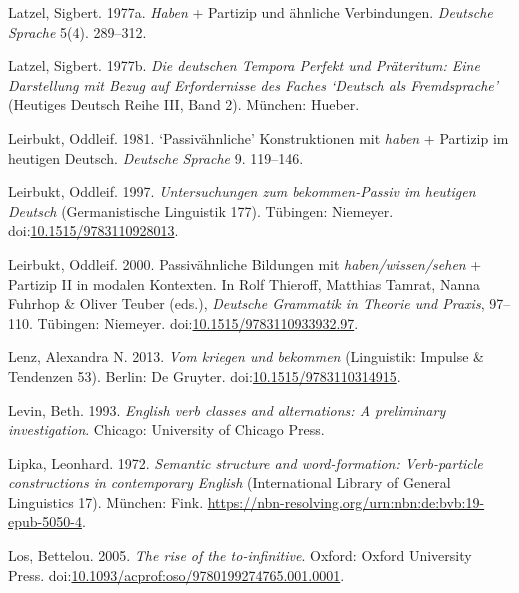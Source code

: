 \leavevmode{}%
Latzel, Sigbert. 1977a. \emph{Haben} + {Partizip} und ähnliche
{Verbindungen}. \emph{Deutsche Sprache} 5(4). 289--312.

\leavevmode{}%
Latzel, Sigbert. 1977b. \emph{Die deutschen {Tempora} {Perfekt} und
{Präteritum}: Eine {Darstellung} mit {Bezug} auf {Erfordernisse} des
{Faches} {`{Deutsch} als {Fremdsprache}'}} (Heutiges Deutsch Reihe III,
Band 2). München: Hueber.

\leavevmode{}%
Leirbukt, Oddleif. 1981. {`Passivähnliche'} {Konstruktionen} mit
\emph{haben} + {Partizip} im heutigen {Deutsch}. \emph{Deutsche Sprache}
9. 119--146.

\leavevmode{}%
Leirbukt, Oddleif. 1997. \emph{Untersuchungen zum
\emph{bekommen}-{Passiv} im heutigen {Deutsch}} (Germanistische
Linguistik 177). Tübingen: Niemeyer.
doi:\href{https://doi.org/10.1515/9783110928013}{10.1515/9783110928013}.

\leavevmode{}%
Leirbukt, Oddleif. 2000. Passivähnliche {Bildungen} mit
\emph{haben/wissen/sehen} + {Partizip II} in modalen {Kontexten}. In
Rolf Thieroff, Matthias Tamrat, Nanna Fuhrhop \& Oliver Teuber (eds.),
\emph{{Deutsche Grammatik in Theorie und Praxis}}, 97--110. Tübingen:
Niemeyer.
doi:\href{https://doi.org/10.1515/9783110933932.97}{10.1515/9783110933932.97}.

\leavevmode{}%
Lenz, Alexandra N. 2013. \emph{Vom \emph{kriegen} und \emph{bekommen}}
(Linguistik: Impulse \& Tendenzen 53). Berlin: De Gruyter.
doi:\href{https://doi.org/10.1515/9783110314915}{10.1515/9783110314915}.

\leavevmode{}%
Levin, Beth. 1993. \emph{English verb classes and alternations: A
preliminary investigation}. Chicago: University of Chicago Press.

\leavevmode{}%
Lipka, Leonhard. 1972. \emph{Semantic structure and word-formation:
Verb-particle constructions in contemporary {English}} (International
Library of General Linguistics 17). München: Fink.
\url{https://nbn-resolving.org/urn:nbn:de:bvb:19-epub-5050-4}.

\leavevmode{}%
Los, Bettelou. 2005. \emph{The rise of the \emph{to}-infinitive}.
Oxford: Oxford University Press.
doi:\href{https://doi.org/10.1093/acprof:oso/9780199274765.001.0001}{10.1093/acprof:oso/9780199274765.001.0001}.

